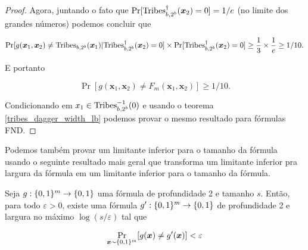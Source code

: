 \begin{proof}
Agora, juntando o fato que $\Pr[\text{Tribes}_{b, 2^{b}}^{\dagger}(\boldsymbol{x}_{2}) = 0] = 1/e$ (no limite dos grandes números) podemos concluir que

\begin{equation*}
\Pr[g(\boldsymbol{x}_{1}, \boldsymbol{x}_{2}) \neq \text{Tribes}_{b, 2^{b}}(\boldsymbol{x}_{1}) \lvert \text{Tribes}_{b, 2^{b}}^{\dagger}(\boldsymbol{x}_{2}) = 0] \times \Pr[\text{Tribes}_{b, 2^{b}}^{\dagger}(\boldsymbol{x}_{2}) = 0] \geq \frac{1}{3} \times \frac{1}{e} \geq 1/10.
\end{equation*}

E portanto

\begin{equation*}
    \Pr[g(\boldsymbol{x}_{1}, \boldsymbol{x}_{2}) \neq F_{m}(\boldsymbol{x}_{1}, \boldsymbol{x}_{2})] \geq 1/10.
\end{equation*}

Condicionando em $x_{1} \in \text{Tribes}_{b, 2^{b}}^{-1}(0)$ e usando o teorema \ref{tribes_dagger_width_lb} podemos provar o mesmo resultado para fórmulas FND.

\end{proof}

Podemos também provar um limitante inferior para o tamanho da fórmula usando o seguinte resultado mais geral que transforma um limitante inferior pra largura da fórmula em um limitante inferior para o tamanho da fórmula.

\begin{teo} \label{width_to_size}
Seja $g: \{0, 1\}^{m} \to \{0, 1\}$ uma fórmula de profundidade 2 e tamanho $s$. Então, para todo $\varepsilon > 0$, existe uma fórmula $g^{\prime}: \{0, 1\}^{m} \to \{0, 1\}$ de profundidade 2 e largura no máximo $\log(s/\varepsilon)$ tal que

\begin{equation*}
    \Pr_{\boldsymbol{x} \sim \{0, 1\}^{m}}[g(\boldsymbol{x}) \neq g^{\prime}(\boldsymbol{x})] < \varepsilon
\end{equation*}

\end{teo}

